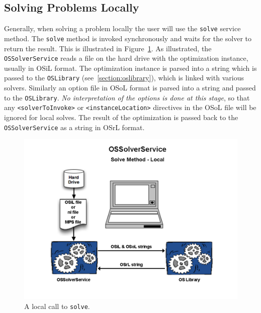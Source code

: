 \subsection{Solving Problems Locally}

Generally, when solving a problem locally the user will use the {\tt solve} service 
method. The {\tt solve} method is invoked synchronously and waits for the solver to return the result.  
This is illustrated in Figure~\ref{figure:ossolverservicelocal}. As illustrated, the {\tt OSSolverService} 
reads a file on the hard drive with the optimization instance, usually in OSiL format. 
The optimization instance is parsed into a string which is passed to the {\tt OSLibrary} 
(see~\ref{section:oslibrary}), which is linked with various solvers. 
Similarly an option file in OSoL format is parsed into a string and passed to the {\tt OSLibrary}. 
{\it No interpretation of the options is done at this stage}, so that any {\tt <solverToInvoke>} or
{\tt <instanceLocation>} directives in the OSoL file will be ignored for local solves.
The result of the optimization is passed back to the {\tt OSSolverService} as a string in OSrL format.



\begin{figure}
\centering
\includegraphics[scale=0.5]{./figures/Figure9.png}
\caption{A local call to {\tt solve}.}
\label{figure:ossolverservicelocal}
\end{figure}



